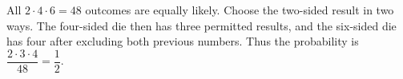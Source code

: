 All $2\cdot4\cdot6=48$ outcomes are equally likely. Choose the two-sided result in two ways. The four-sided die then has three permitted results, and the six-sided die has four after excluding both previous numbers. Thus the probability is $\dfrac{2\cdot3\cdot4}{48}=\boxed{\dfrac{1}{2}}$.
